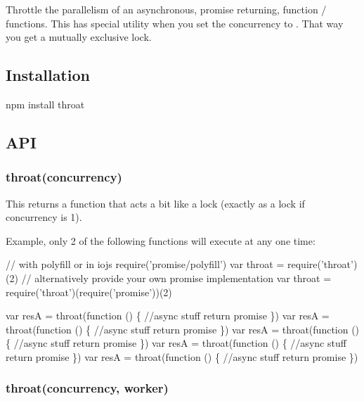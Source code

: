 Throttle the parallelism of an asynchronous, promise returning, function / functions. This has special utility when you set the concurrency to {}. That way you get a mutually exclusive lock.

\href{https://travis-ci.org/ForbesLindesay/throat}{\tt } \href{https://coveralls.io/r/ForbesLindesay/throat?branch=master}{\tt } \href{https://david-dm.org/ForbesLindesay/throat}{\tt } \href{https://www.npmjs.com/package/throat}{\tt } \href{https://greenkeeper.io/}{\tt }

\href{https://saucelabs.com/u/throat}{\tt }

\subsection*{Installation}

\begin{DoxyVerb}npm install throat
\end{DoxyVerb}


\subsection*{A\+PI}

\subsubsection*{throat(concurrency)}

This returns a function that acts a bit like a lock (exactly as a lock if concurrency is 1).

Example, only 2 of the following functions will execute at any one time\+:


\begin{DoxyCode}
// with polyfill or in iojs
require('promise/polyfill')
var throat = require('throat')(2)
// alternatively provide your own promise implementation
var throat = require('throat')(require('promise'))(2)

var resA = throat(function () \{
  //async stuff
  return promise
\})
var resA = throat(function () \{
  //async stuff
  return promise
\})
var resA = throat(function () \{
  //async stuff
  return promise
\})
var resA = throat(function () \{
  //async stuff
  return promise
\})
var resA = throat(function () \{
  //async stuff
  return promise
\})
\end{DoxyCode}


\subsubsection*{throat(concurrency, worker)}


